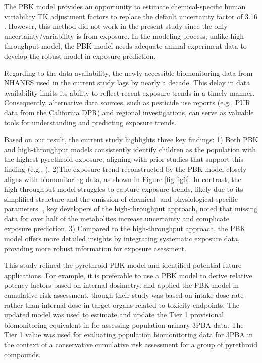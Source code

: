 \documentclass[toxics,article,submit,pdftex,moreauthors]{Definitions/mdpi}
\begin{document}
The PBK model provides an opportunity to estimate chemical-specific human
variability TK adjustment factors to replace the default uncertainty factor of
3.16 \citep{chiu_advancing_2018}. However, this method did not work in the
present study since the only uncertainty/variability is from exposure. In the
modeling process, unlike high-throughput model, the PBK model needs adequate
animal experiment data to develop the robust model in exposure prediction.

Regarding to the data availability, the newly accessible biomonitoring
data from NHANES used in the current study lags by nearly a decade. This
delay in data availability limits its ability to reflect recent exposure
trends in a timely manner. Consequently, alternative data sources, such
as pesticide use reports (e.g., PUR data from the California DPR) and
regional investigations, can serve as valuable tools for understanding
and predicting exposure trends.

Based on our result, the current study highlights three key findings: 1) Both 
PBK and high-throughput models consistently identify children
as the population with the highest pyrethroid exposure, aligning with prior
studies that support this finding (e.g., \citep{barr2010urinary}). 2)The
exposure trend reconstructed by the PBK model closely aligns with biomonitoring
data, as shown in Figure \ref{fig:fig6}. In contrast, the high-throughput model struggles to
capture exposure trends, likely due to its simplified structure and the omission of
chemical- and physiological-specific parameters. \citep{stanfield2022bayesian}, key
developers of the high-throughput approach, noted that missing data for over
half of the metabolites increase uncertainty and complicate exposure
prediction. 3) Compared to the high-throughput approach, the PBK model offers more
detailed insights by integrating systematic exposure data, providing more
robust information for exposure asessment.

This study refined the pyrethroid PBK model and identified potential
future applications. For example, it is preferable to use a PBK model to
derive relative potency factors based on internal dosimetry.
\citet{quindroit2021estimating} and \citet{thepaut_pbpk_2024} applied
the PBK model in cumulative risk assessment, though their study was
based on intake dose rate rather than internal dose in target organs
related to toxicity endpoints. The updated model was used to estimate
and update the Tier 1 provisional biomonitoring equivalent in
\citet{aylward_screening_level_2018} for assessing population urinary
3PBA data. The Tier 1 value was used for evaluating population
biomonitoring data for 3PBA in the context of a conservative cumulative
risk assessment for a group of pyrethroid compounds.
\end{document}
